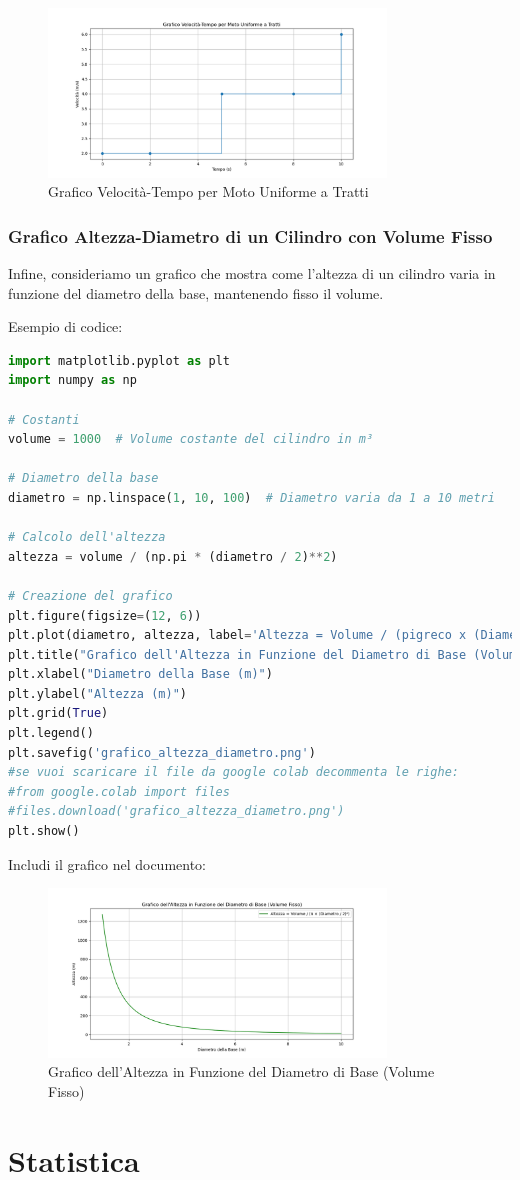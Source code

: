 \begin{figure}[h!]
    \centering
    \includegraphics[width=0.8\textwidth]{grafico_velocita_temporale.png}
    \caption{Grafico Velocità-Tempo per Moto Uniforme a Tratti}
    \label{fig:velocita_temporale}
\end{figure}

\subsection{Grafico Altezza-Diametro di un Cilindro con Volume Fisso}
Infine, consideriamo un grafico che mostra come l'altezza di un cilindro varia in funzione del diametro della base, mantenendo fisso il volume.

Esempio di codice:
\begin{lstlisting}[language=Python]
import matplotlib.pyplot as plt
import numpy as np

# Costanti
volume = 1000  # Volume costante del cilindro in m³

# Diametro della base
diametro = np.linspace(1, 10, 100)  # Diametro varia da 1 a 10 metri

# Calcolo dell'altezza
altezza = volume / (np.pi * (diametro / 2)**2)

# Creazione del grafico
plt.figure(figsize=(12, 6))
plt.plot(diametro, altezza, label='Altezza = Volume / (pigreco x (Diametro / 2)^2)', color='green')
plt.title("Grafico dell'Altezza in Funzione del Diametro di Base (Volume Fisso)")
plt.xlabel("Diametro della Base (m)")
plt.ylabel("Altezza (m)")
plt.grid(True)
plt.legend()
plt.savefig('grafico_altezza_diametro.png')
#se vuoi scaricare il file da google colab decommenta le righe:
#from google.colab import files
#files.download('grafico_altezza_diametro.png')
plt.show()
\end{lstlisting}

Includi il grafico nel documento:
\begin{figure}[h!]
    \centering
    \includegraphics[width=0.8\textwidth]{grafico_altezza_diametro.png}
    \caption{Grafico dell'Altezza in Funzione del Diametro di Base (Volume Fisso)}
    \label{fig:altezza_diametro}
\end{figure}
\chapter{Statistica}
